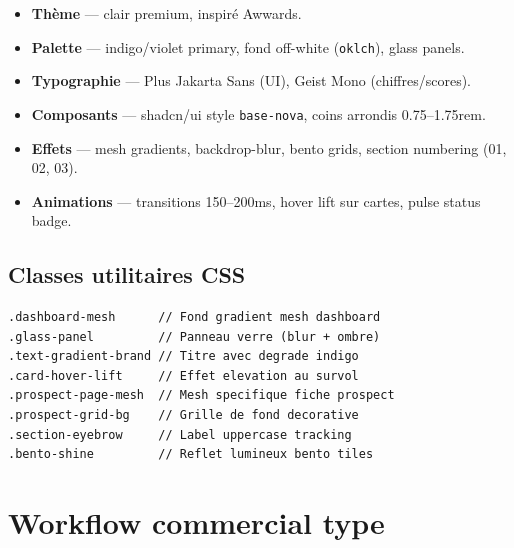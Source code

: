\documentclass[11pt,a4paper]{report}
\begin{document}
\begin{itemize}[leftmargin=*]
  \item \textbf{Thème} --- clair premium, inspiré Awwards.
  \item \textbf{Palette} --- indigo/violet primary, fond off-white (\texttt{oklch}), glass panels.
  \item \textbf{Typographie} --- Plus Jakarta Sans (UI), Geist Mono (chiffres/scores).
  \item \textbf{Composants} --- shadcn/ui style \texttt{base-nova}, coins arrondis 0.75--1.75rem.
  \item \textbf{Effets} --- mesh gradients, backdrop-blur, bento grids, section numbering (01, 02, 03).
  \item \textbf{Animations} --- transitions 150--200ms, hover lift sur cartes, pulse status badge.
\end{itemize}

\section{Classes utilitaires CSS}

\begin{lstlisting}
.dashboard-mesh      // Fond gradient mesh dashboard
.glass-panel         // Panneau verre (blur + ombre)
.text-gradient-brand // Titre avec degrade indigo
.card-hover-lift     // Effet elevation au survol
.prospect-page-mesh  // Mesh specifique fiche prospect
.prospect-grid-bg    // Grille de fond decorative
.section-eyebrow     // Label uppercase tracking
.bento-shine         // Reflet lumineux bento tiles
\end{lstlisting}

\chapter{Workflow commercial type}
\end{document}

